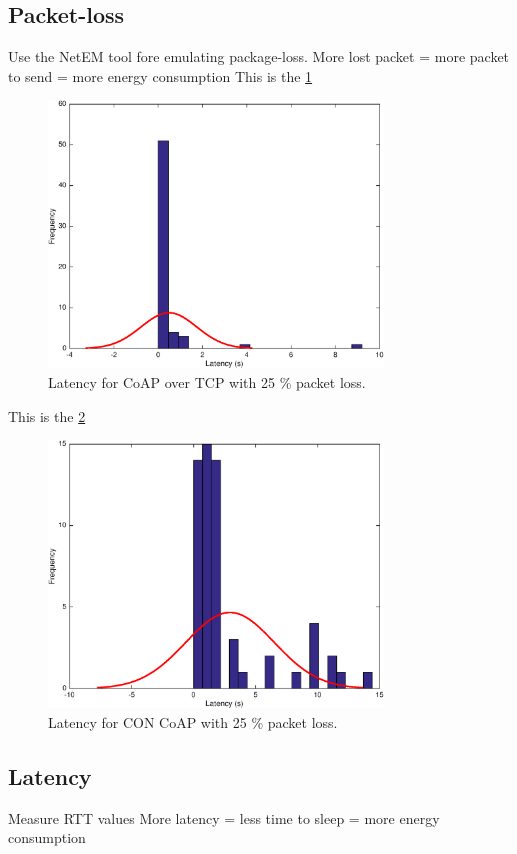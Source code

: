 \subsection{Packet-loss}
Use the NetEM tool fore emulating package-loss.
More lost packet = more packet to send = more energy consumption
This is the \figurename \ref{coapovertcploss}
\begin{figure}[bh]
	\centering
	\includegraphics[width=3.5in]{gfx/coapovertcp25loss}
	\caption{Latency for CoAP over TCP with 25 \% packet loss.}
	\label{coapovertcploss}
\end{figure}

This is the \figurename \ref{coapoverudploss}
\begin{figure}[bh]
	\centering
	\includegraphics[width=3.5in]{gfx/coapoverudp25loss}
	\caption{Latency for CON CoAP with 25 \% packet loss.}
	\label{coapoverudploss}
\end{figure}


\subsection{Latency}
Measure RTT values %
More latency = less time to sleep = more energy consumption

